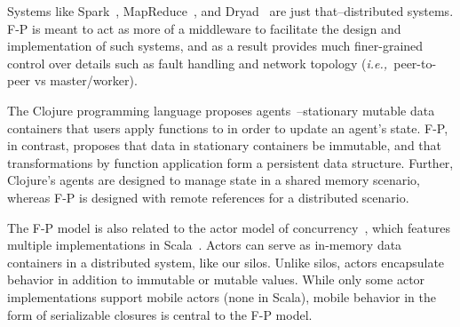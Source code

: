 \documentclass[preprint]{sigplanconf}
\theoremstyle{definition}
\theoremstyle{definition}
\newcommand{\ie}{{\em i.e.,~}}
\begin{document}

Systems like Spark~\cite{Spark}, MapReduce~\cite{MapReduce}, and
Dryad~\cite{Dryad} are just that--distributed systems. F-P is meant to act as
more of a middleware to facilitate the design and implementation of such
systems, and as a result provides much finer-grained control over details such
as fault handling and network topology (\ie peer-to-peer vs master/worker).

The Clojure programming language proposes agents~\cite{Clojure}--stationary
mutable data containers that users apply functions to in order to update an
agent's state. F-P, in contrast, proposes that data in stationary containers
be immutable, and that transformations by function application form a
persistent data structure. Further, Clojure's agents are designed to manage
state in a shared memory scenario, whereas F-P is designed with remote
references for a distributed scenario.

The F-P model is also related to the actor model of concurrency~\cite{Actors},
which features multiple implementations in
Scala~\cite{ScalaActors,Akka,TypedActors}. Actors can serve as in-memory data
containers in a distributed system, like our silos. Unlike silos, actors
encapsulate behavior in addition to immutable or mutable values. While only
some actor implementations support mobile actors (none in Scala), mobile
behavior in the form of serializable closures is central to the F-P model.






\end{document}
